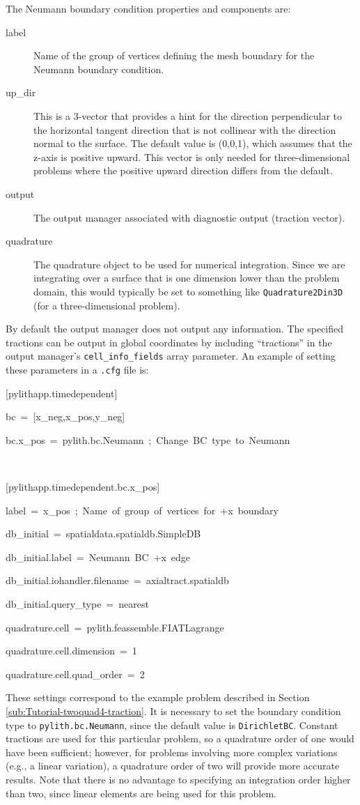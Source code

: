 The Neumann boundary condition properties and components are:
\begin{description}
\item [{label}] Name of the group of vertices defining the mesh boundary
for the Neumann boundary condition.
\item [{up\_dir}] This is a 3-vector that provides a hint for the direction
perpendicular to the horizontal tangent direction that is not collinear
with the direction normal to the surface. The default value is (0,0,1),
which assumes that the z-axis is positive upward. This vector is only
needed for three-dimensional problems where the positive upward direction
differs from the default.
\item [{output}] The output manager associated with diagnostic output (traction
vector).
\item [{quadrature}] The quadrature object to be used for numerical integration.
Since we are integrating over a surface that is one dimension lower
than the problem domain, this would typically be set to something
like \texttt{Quadrature2Din3D} (for a three-dimensional problem).
\end{description}
By default the output manager does not output any information. The
specified tractions can be output in global coordinates by including
``tractions'' in the output manager's \texttt{cell\_info\_fields}
array parameter. An example of setting these parameters in a \texttt{.cfg}
file is:
\begin{lyxcode}
{[}pylithapp.timedependent{]}

bc~=~{[}x\_neg,x\_pos,y\_neg{]}

bc.x\_pos~=~pylith.bc.Neumann~;~Change~BC~type~to~Neumann

~

{[}pylithapp.timedependent.bc.x\_pos{]}

label~=~x\_pos~;~Name~of~group~of~vertices~for~+x~boundary

db\_initial~=~spatialdata.spatialdb.SimpleDB

db\_initial.label~=~Neumann~BC~+x~edge

db\_initial.iohandler.filename~=~axialtract.spatialdb

db\_initial.query\_type~=~nearest

quadrature.cell~=~pylith.feassemble.FIATLagrange

quadrature.cell.dimension~=~1

quadrature.cell.quad\_order~=~2
\end{lyxcode}
These settings correspond to the example problem described in Section
\vref{sub:Tutorial-twoquad4-traction}. It is necessary to set the
boundary condition type to \texttt{pylith.bc.Neumann}, since the default
value is \texttt{DirichletBC}. Constant tractions are used for this
particular problem, so a quadrature order of one would have been sufficient;
however, for problems involving more complex variations (e.g., a linear
variation), a quadrature order of two will provide more accurate results.
Note that there is no advantage to specifying an integration order
higher than two, since linear elements are being used for this problem.

